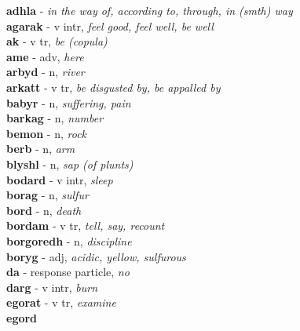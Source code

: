 \textbf{adhla}   - \emph{in the way of, according to, through, in (smth) way}\\ \vspace{7pt}\textbf{agarak}   - v intr, \emph{feel good, feel well, be well}\\ \vspace{7pt}\textbf{ak}   - v tr, \emph{be (copula)}\\ \vspace{7pt}\textbf{ame}   - adv, \emph{here}\\ \vspace{7pt}\textbf{arbyd}   - n, \emph{river}\\ \vspace{7pt}\textbf{arkatt}   - v tr, \emph{be disgusted by, be appalled by}\\ \vspace{7pt}\textbf{babyr}   - n, \emph{suffering, pain}\\ \vspace{7pt}\textbf{barkag}   - n, \emph{number}\\ \vspace{7pt}\textbf{bemon}   - n, \emph{rock}\\ \vspace{7pt}\textbf{berb}   - n, \emph{arm}\\ \vspace{7pt}\textbf{blyshl}   - n, \emph{sap (of plunts)}\\ \vspace{7pt}\textbf{bodard}   - v intr, \emph{sleep}\\ \vspace{7pt}\textbf{borag}   - n, \emph{sulfur}\\ \vspace{7pt}\textbf{bord}   - n, \emph{death}\\ \vspace{7pt}\textbf{bordam}   - v tr, \emph{tell, say, recount}\\ \vspace{7pt}\textbf{borgoredh}   - n, \emph{discipline}\\ \vspace{7pt}\textbf{boryg}   - adj, \emph{acidic, yellow, sulfurous}\\ \vspace{7pt}\textbf{da}   - response particle, \emph{no}\\ \vspace{7pt}\textbf{darg}   - v intr, \emph{burn}\\ \vspace{7pt}\textbf{egorat}   - v tr, \emph{examine}\\ \vspace{7pt}\textbf{egord}  